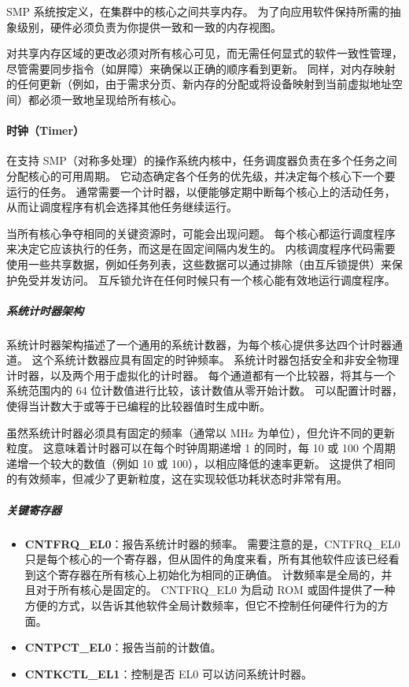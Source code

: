 SMP 系统按定义，在集群中的核心之间共享内存。
为了向应用软件保持所需的抽象级别，硬件必须负责为你提供一致和一致的内存视图。

对共享内存区域的更改必须对所有核心可见，而无需任何显式的软件一致性管理，尽管需要同步指令（如屏障）来确保以正确的顺序看到更新。
同样，对内存映射的任何更新（例如，由于需求分页、新内存的分配或将设备映射到当前虚拟地址空间）都必须一致地呈现给所有核心。

\paragraph{时钟（Timer）}

在支持 SMP（对称多处理）的操作系统内核中，任务调度器负责在多个任务之间分配核心的可用周期。
它动态确定各个任务的优先级，并决定每个核心下一个要运行的任务。
通常需要一个计时器，以便能够定期中断每个核心上的活动任务，从而让调度程序有机会选择其他任务继续运行。

当所有核心争夺相同的关键资源时，可能会出现问题。
每个核心都运行调度程序来决定它应该执行的任务，而这是在固定间隔内发生的。
内核调度程序代码需要使用一些共享数据，例如任务列表，这些数据可以通过排除（由互斥锁提供）来保护免受并发访问。
互斥锁允许在任何时候只有一个核心能有效地运行调度程序。

\subparagraph*{系统计时器架构}

系统计时器架构描述了一个通用的系统计数器，为每个核心提供多达四个计时器通道。
这个系统计数器应具有固定的时钟频率。
系统计时器包括安全和非安全物理计时器，以及两个用于虚拟化的计时器。
每个通道都有一个比较器，将其与一个系统范围内的 64 位计数值进行比较，该计数值从零开始计数。
可以配置计时器，使得当计数大于或等于已编程的比较器值时生成中断。

虽然系统计时器必须具有固定的频率（通常以 MHz 为单位），但允许不同的更新粒度。
这意味着计时器可以在每个时钟周期递增 1 的同时，每 10 或 100 个周期递增一个较大的数值（例如 10 或 100），以相应降低的速率更新。
这提供了相同的有效频率，但减少了更新粒度，这在实现较低功耗状态时非常有用。

\subparagraph*{关键寄存器}

\begin{itemize}
  \item
    \textbf{CNTFRQ\_EL0}：报告系统计时器的频率。
    需要注意的是，CNTFRQ\_EL0 只是每个核心的一个寄存器，但从固件的角度来看，所有其他软件应该已经看到这个寄存器在所有核心上初始化为相同的正确值。
    计数频率是全局的，并且对于所有核心是固定的。
    CNTFRQ\_EL0 为启动 ROM 或固件提供了一种方便的方式，以告诉其他软件全局计数频率，但它不控制任何硬件行为的方面。
  \item
    \textbf{CNTPCT\_EL0}：报告当前的计数值。
  \item
    \textbf{CNTKCTL\_EL1}：控制是否 EL0 可以访问系统计时器。
\end{itemize}

